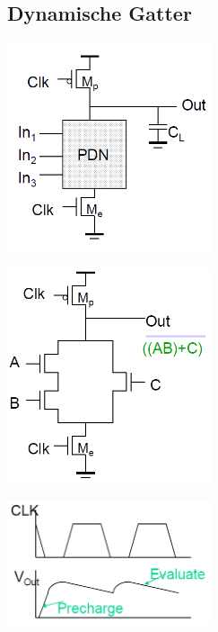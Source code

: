 	\subsection{Dynamische Gatter}
		\begin{multicols}{3}
			\includegraphics[width=6cm]{images/cmosDynPrinzip.png}\\
			\columnbreak
			
			\includegraphics[width=6cm]{images/cmosDynSchema.png}\\
			\columnbreak
			
			\includegraphics[width=6cm]{images/cmosDynSignal.png}
			\columnbreak
			
		\end{multicols}	
	